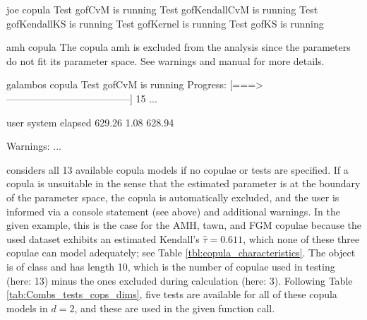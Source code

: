 \begin{example}
joe copula
Test gofCvM is running
Test gofKendallCvM is running                                     
Test gofKendallKS is running                                      
Test gofKernel is running                                         
Test gofKS is running                                             
                                                                  
amh copula
The copula amh is excluded from the analysis since the parameters do not fit its 
parameter space. See warnings and manual for more details.

galambos copula
Test gofCvM is running
Progress: [===>--------------------------------------]  15%
...

   user  system  elapsed 
 629.26    1.08   628.94

Warnings:
...
\end{example}
 considers all 13 available copula models if no copulae or tests are specified. If a copula is unsuitable in the sense that the estimated parameter is at the boundary of the parameter space, the copula is automatically excluded, and the user is informed via a console statement (see above) and additional warnings. In the given example, this is the case for the AMH, tawn, and FGM copulae because the used  dataset exhibits an estimated Kendall's $\hat{\tau} = 0.611$, which none of these three copulae can model adequately; see Table \ref{tbl:copula_characteristics}. The object  is of class  and has length 10, which is the number of copulae used in testing (here: 13) minus the ones excluded during calculation (here: 3). Following Table \ref{tab:Combs_tests_cops_dims}, five tests are available for all of these copula models in $d = 2$, and these are used in the given function call.

